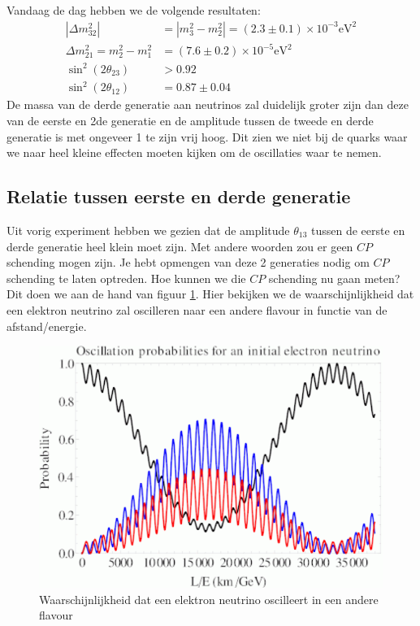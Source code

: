 \documentclass[../main.tex]{subfiles}
\begin{document}
Vandaag de dag hebben we de volgende resultaten:
\begin{equation}
    \begin{aligned}
        \label{eq:neutrino_osc_waarden_vervolg}
        \left|\Delta m_{32}^{2}\right|&=\left|m_{3}^{2}-m_{2}^{2}\right|=(2.3 \pm 0.1) \times 10^{-3} \mathrm{eV}^{2} \\
        \Delta m_{21}^{2}=m_{2}^{2}-m_{1}^{2}&=(7.6 \pm 0.2) \times 10^{-5} \mathrm{eV}^{2} \\
        \sin ^{2}\left(2 \theta_{23}\right)&>0.92 \\
        \sin ^{2}\left(2 \theta_{12}\right)&=0.87 \pm 0.04
    \end{aligned}
\end{equation}
De massa van de derde generatie aan neutrinos zal duidelijk groter zijn dan deze van de eerste en 2de generatie en de amplitude tussen de tweede en derde generatie is met ongeveer 1 te zijn vrij hoog. Dit zien we niet bij de quarks waar we naar heel kleine effecten moeten kijken om de oscillaties waar te nemen.

\subsection{Relatie tussen eerste en derde generatie}%
\label{sub:relatie_tussen_eerste_en_derde_generatie}

Uit vorig experiment hebben we gezien dat de amplitude $\theta_{13}$ tussen de eerste en derde generatie heel klein moet zijn. Met andere woorden zou er geen $CP$ schending mogen zijn. Je hebt opmengen van deze 2 generaties nodig om $CP$ schending te laten optreden. Hoe kunnen we die $CP$ schending nu gaan meten? Dit doen we aan de hand van figuur \ref{fig:neutrinos/neutr_osc_waarschijnlijkheid}. Hier bekijken we de waarschijnlijkheid dat een elektron neutrino zal oscilleren naar een andere flavour in functie van de afstand/energie.

\begin{figure}[h]
    \centering
    \includegraphics[width=0.6\linewidth]{neutrinos/neutr_osc_waarschijnlijkheid.png}
    \caption{Waarschijnlijkheid dat een elektron neutrino oscilleert in een andere flavour}%
    \label{fig:neutrinos/neutr_osc_waarschijnlijkheid}
\end{figure}
\end{document}
